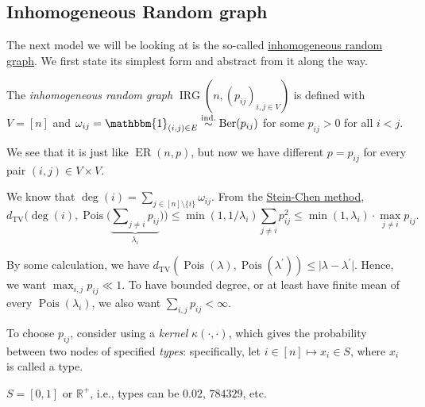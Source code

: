 \subsection{Inhomogeneous Random graph}
The next model we will be looking at is the so-called \hyperref[def:inhomogeneous-random-graph]{inhomogeneous random graph}. We first state its simplest form and abstract from it along the way.

\begin{definition}\label{def:inhomogeneous-random-graph}
	The \emph{inhomogeneous random graph} \(\operatorname{IRG}(n, (p_{ij})_{i, j \in V})\) is defined with \(V = [n]\) and \(\omega _{ij} = \mathbbm{1}_{(i, j) \in E} \overset{\text{ind.} }{\sim } \operatorname{Ber}(p_{ij}) \) for some \(p_{ij} > 0\) for all \(i < j\).
\end{definition}

We see that it is just like \(\operatorname{ER}(n, p) \), but now we have different \(p = p_{ij} \) for every pair \((i, j) \in V \times V\).

\begin{prev}
	We know that \(\deg (i) = \sum_{j \in [n] \setminus \{ i \} } \omega _{ij}\). From the \hyperref[thm:Stein-Chen-method]{Stein-Chen method},
	\[
		d_{\mathrm{TV} }\Big(\deg (i) , \operatorname{Pois}\big(\underbrace{\sum\nolimits_{j \neq i} p_{ij}}_{\lambda _i} \big) \Big)
		\leq \min (1 , 1 / \lambda _i) \sum_{j \neq i} p_{ij}^2
		\leq \min (1, \lambda _i) \cdot \max _{j \neq i} p_{ij}.
	\]
\end{prev}

By some calculation, we have \(d_{\mathrm{TV} }(\operatorname{Pois}(\lambda ) , \operatorname{Pois}(\lambda ^{\prime} ) ) \leq \lvert \lambda - \lambda ^{\prime} \rvert \). Hence, we want \(\max _{i, j} p_{ij} \ll 1\). To have bounded degree, or at least have finite mean of every \(\operatorname{Pois}(\lambda _i) \), we also want \(\sum_{i, j} p_{ij} < \infty \).

To choose \(p_{ij}\), consider using a \emph{kernel} \(\kappa (\cdot , \cdot )\), which gives the probability between two nodes of specified \emph{types}: specifically, let \(i \in [n] \mapsto x_i \in S\), where \(x_i\) is called a type.

\begin{eg}
	\(S = [0, 1]\) or \(\mathbb{R} ^+\), i.e., types can be \(0.02\), \(784329\), etc.
\end{eg}

